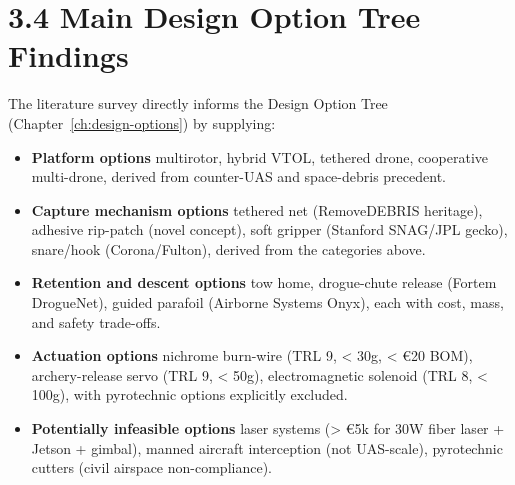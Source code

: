 \section*{3.4 Main Design Option Tree Findings}

The literature survey directly informs the Design Option Tree (Chapter~\ref{ch:design-options}) by supplying:

\begin{itemize}
	\item \textbf{Platform options}  multirotor, hybrid VTOL, tethered drone, cooperative multi-drone, derived from counter-UAS and space-debris precedent.
	
	\item \textbf{Capture mechanism options}  tethered net (RemoveDEBRIS heritage), adhesive rip-patch (novel concept), soft gripper (Stanford SNAG/JPL gecko), snare/hook (Corona/Fulton), derived from the categories above.
	
	\item \textbf{Retention and descent options}  tow home, drogue-chute release (Fortem DrogueNet), guided parafoil (Airborne Systems Onyx), each with cost, mass, and safety trade-offs.
	
	\item \textbf{Actuation options}  nichrome burn-wire (TRL 9, < 30g, < €20 BOM), archery-release servo (TRL 9, < 50g), electromagnetic solenoid (TRL 8, < 100g), with pyrotechnic options explicitly excluded.
	
	\item \textbf{Potentially infeasible options}  laser systems (> €5k for 30W fiber laser + Jetson + gimbal), manned aircraft interception (not UAS-scale), pyrotechnic cutters (civil airspace non-compliance).
\end{itemize}



\newpage